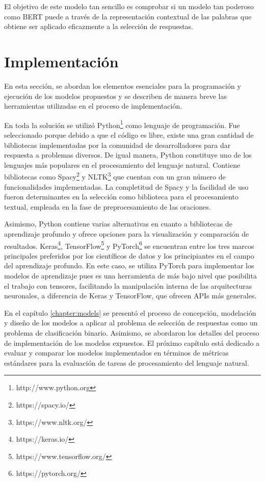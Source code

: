 El objetivo de este modelo tan sencillo es comprobar si un modelo tan poderoso como BERT puede a través de la representación contextual de las palabras que obtiene ser aplicado eficazmente a la selección de respuestas.

\section{Implementación}\label{section:implementation}

En esta sección, se abordan los elementos esenciales para la programación y ejecución de los modelos propuestos y se describen de manera breve las herramientas utilizadas en el proceso de implementación.

En toda la solución se utilizó Python\footnote{http://www.python.org} como lenguaje de programación. Fue seleccionado porque debido a que el código es libre, existe una gran cantidad de bibliotecas implementadas por la comunidad de desarrolladores para dar respuesta a problemas diversos. De igual manera, Python constituye uno de los lenguajes más populares en el procesamiento del lenguaje natural. Contiene bibliotecas como Spacy\footnote{https://spacy.io/} y NLTK\footnote{https://www.nltk.org/} que cuentan con un gran número de funcionalidades implementadas. La completitud de Spacy y la facilidad de uso fueron determinantes en la selección como biblioteca para el procesamiento textual, empleada en la fase de preprocesamiento de las oraciones. 

Asimismo, Python contiene varias alternativas en cuanto a bibliotecas de aprendizaje profundo y ofrece opciones para la visualización y comparación de resultados. Keras\footnote{https://keras.io/}, TensorFlow\footnote{https://www.tensorflow.org/} y PyTorch\footnote{https://pytorch.org/} se encuentran entre los tres marcos principales preferidos por los científicos de datos y los principiantes en el campo del aprendizaje profundo. En este caso, se utiliza PyTorch para implementar los modelos de aprendizaje pues es una herramienta de más bajo nivel que posibilita el trabajo con tensores, facilitando la manipulación interna de las arquitecturas neuronales, a diferencia de Keras y TensorFlow, que ofrecen APIs más generales.

En el capítulo \ref{chapter:models} se presentó el proceso de concepción, modelación y diseño de los modelos a aplicar al problema de selección de respuestas como un problema de clasificación binario. Asimismo, se abordaron los detalles del proceso de implementación de los modelos expuestos. El próximo capítulo está dedicado a evaluar y comparar los modelos implementados en términos de métricas estándares para la evaluación de tareas de procesamiento del lenguaje natural.





